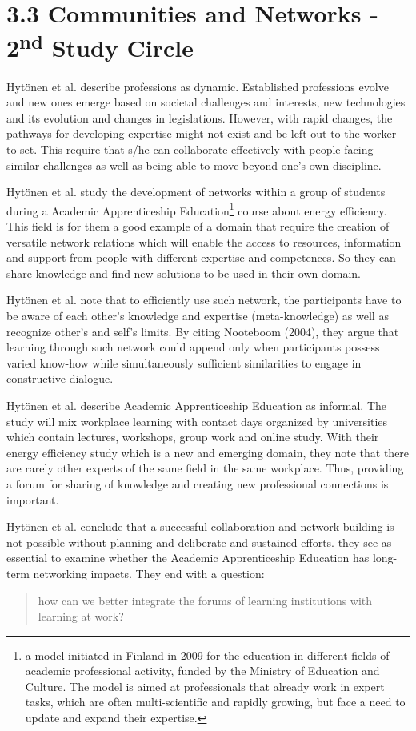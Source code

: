 \section*{3.3 Communities and Networks - 2\textsuperscript{nd} Study Circle}

Hytönen et al. \cite{hytonen2014does} describe professions as dynamic. Established professions evolve and new ones emerge based on societal challenges and interests, new technologies and its evolution and changes in legislations. However, with rapid changes, the pathways for developing expertise might not exist and be left out to the worker to set. This require that s/he can collaborate effectively with people facing similar challenges as well as being able to move beyond one's own discipline.

Hytönen et al. \cite{hytonen2014does} study the development of networks within a group of students during a Academic Apprenticeship Education\footnote{a model initiated in Finland in 2009 for the education in different fields of academic professional activity, funded by the Ministry of Education and Culture. The model is aimed at professionals that already work in expert tasks, which are
often multi-scientific and rapidly growing, but face a need to update and expand their expertise.} course about energy efficiency. This field is for them a good example of a domain that require the creation of versatile network relations which will enable the access to resources, information and
support from people with different expertise and competences. So they can share knowledge and find new solutions to be used in their own domain.

Hytönen et al. \cite{hytonen2014does} note that to efficiently use such network, the participants have to be aware of each other's knowledge and expertise (meta-knowledge) as well as recognize other's and self's limits. By citing Nooteboom (2004), they argue that learning through such network could append only when participants possess varied know-how while simultaneously sufficient similarities to engage in constructive dialogue.

Hytönen et al. \cite{hytonen2014does} describe Academic Apprenticeship Education as informal. The study will mix workplace learning with contact days organized by universities which contain lectures, workshops, group work and online study. With their energy efficiency study which is a new and emerging domain, they note that there are rarely other experts of the same field in the same workplace. Thus, providing a forum for sharing of knowledge and creating new professional connections is important.

Hytönen et al. \cite{hytonen2014does} conclude that a successful collaboration and network building is not possible without planning and deliberate and sustained efforts. they see as essential to examine whether the Academic Apprenticeship Education has long-term networking impacts. They end with a question: \begin{quote}
how can we better integrate the forums of learning institutions with
learning at work?
\end{quote}